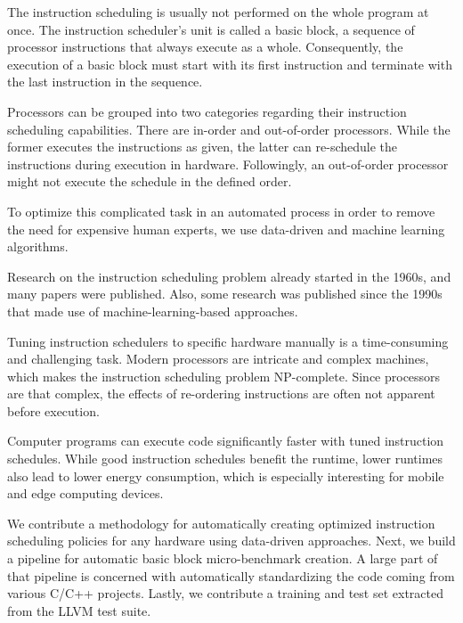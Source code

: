 The instruction scheduling is usually not performed on the whole program at once.
The instruction scheduler's unit is called a basic block, a sequence of processor instructions that always execute as a whole.
Consequently, the execution of a basic block must start with its first instruction and terminate with the last instruction in the sequence.

Processors can be grouped into two categories regarding their instruction scheduling capabilities.
There are in-order and out-of-order processors.
While the former executes the instructions as given, the latter can re-schedule the instructions during execution in hardware.
Followingly, an out-of-order processor might not execute the schedule in the defined order.

To optimize this complicated task in an automated process in order to remove the need for expensive human experts, we use data-driven and machine learning algorithms.

Research on the instruction scheduling problem already started in the 1960s, and many papers were published.
Also, some research was published since the 1990s that made use of machine-learning-based approaches.

Tuning instruction schedulers to specific hardware manually is a time-consuming and challenging task.
Modern processors are intricate and complex machines, which makes the instruction scheduling problem NP-complete.
Since processors are that complex, the effects of re-ordering instructions are often not apparent before execution.

Computer programs can execute code significantly faster with tuned instruction schedules. 
While good instruction schedules benefit the runtime, lower runtimes also lead to lower energy consumption, which is especially interesting for mobile and edge computing devices.

We contribute a methodology for automatically creating optimized instruction scheduling policies for any hardware using data-driven approaches.
Next, we build a pipeline for automatic basic block micro-benchmark creation.
A large part of that pipeline is concerned with automatically standardizing the code coming from various C/C++ projects.
Lastly, we contribute a training and test set extracted from the LLVM test suite.

